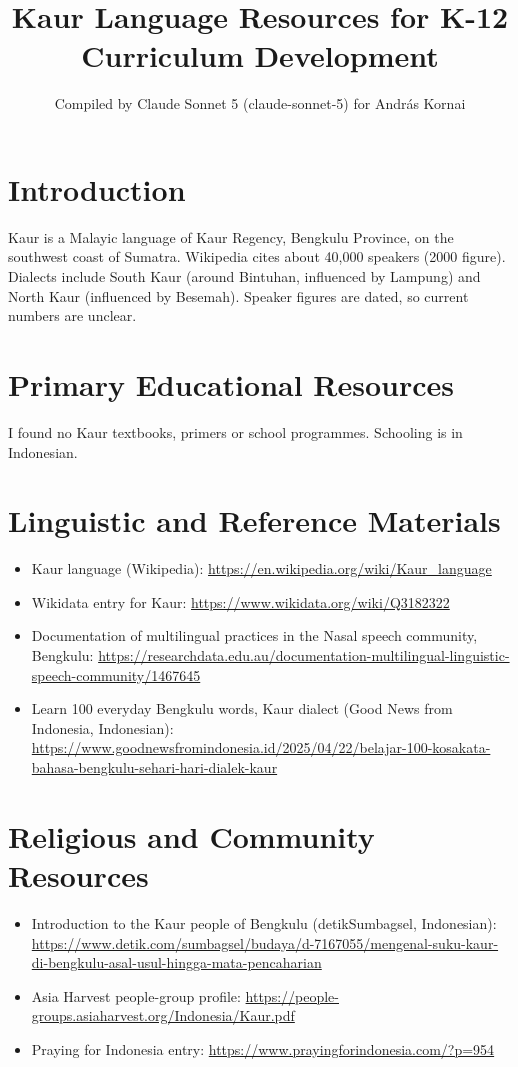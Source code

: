 \documentclass[12pt]{article}
\title{Kaur Language Resources for K-12 Curriculum Development}
\author{Compiled by Claude Sonnet 5 (claude-sonnet-5) for Andr\'as Kornai}
\date{}
\begin{document}
\maketitle

\section{Introduction}
Kaur is a Malayic language of Kaur Regency, Bengkulu Province, on the southwest coast of Sumatra. Wikipedia cites about 40,000 speakers (2000 figure). Dialects include South Kaur (around Bintuhan, influenced by Lampung) and North Kaur (influenced by Besemah). Speaker figures are dated, so current numbers are unclear.

\section{Primary Educational Resources}
I found no Kaur textbooks, primers or school programmes. Schooling is in Indonesian.

\section{Linguistic and Reference Materials}
\begin{itemize}
\item Kaur language (Wikipedia): \url{https://en.wikipedia.org/wiki/Kaur_language}
\item Wikidata entry for Kaur: \url{https://www.wikidata.org/wiki/Q3182322}
\item Documentation of multilingual practices in the Nasal speech community, Bengkulu: \url{https://researchdata.edu.au/documentation-multilingual-linguistic-speech-community/1467645}
\item Learn 100 everyday Bengkulu words, Kaur dialect (Good News from Indonesia, Indonesian): \url{https://www.goodnewsfromindonesia.id/2025/04/22/belajar-100-kosakata-bahasa-bengkulu-sehari-hari-dialek-kaur}
\end{itemize}

\section{Religious and Community Resources}
\begin{itemize}
\item Introduction to the Kaur people of Bengkulu (detikSumbagsel, Indonesian): \url{https://www.detik.com/sumbagsel/budaya/d-7167055/mengenal-suku-kaur-di-bengkulu-asal-usul-hingga-mata-pencaharian}
\item Asia Harvest people-group profile: \url{https://people-groups.asiaharvest.org/Indonesia/Kaur.pdf}
\item Praying for Indonesia entry: \url{https://www.prayingforindonesia.com/?p=954}
\end{itemize}
\end{document}
